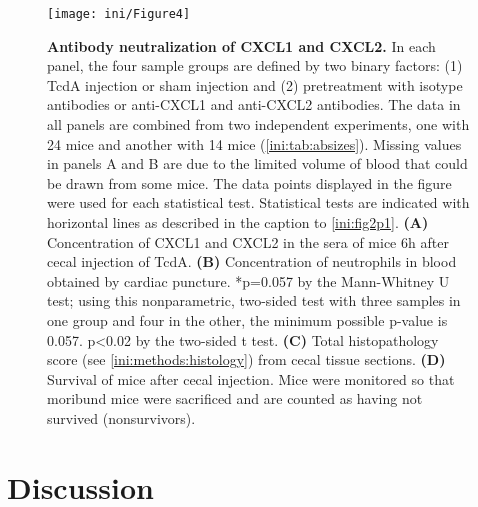 \begin{figure}[h!]
  \centering
  \texttt{[image: ini/Figure4]}
  \caption[Antibody neutralization of CXCL1 and CXCL2]{
       \textbf{Antibody neutralization of CXCL1 and CXCL2.}
        In each panel, the four sample groups are defined by two binary 
        factors: (1) TcdA injection or sham injection and (2) pretreatment 
        with isotype antibodies or anti-CXCL1 and anti-CXCL2 antibodies. 
        The data in all panels are combined from two independent 
        experiments, one with 24 mice and another with 14 mice 
        (\autoref{ini:tab:absizes}). Missing values in panels A and 
        B are due to the limited volume of blood that could be 
        drawn from some mice. The data points displayed in the figure 
        were used for each statistical test. Statistical tests are 
        indicated with horizontal lines as described in the caption 
        to \autoref{ini:fig2p1}. \textbf{(A)} Concentration of CXCL1 
        and CXCL2 in the sera of mice 6h after cecal injection of 
        TcdA. \textbf{(B)} Concentration of neutrophils in blood 
        obtained by cardiac puncture. *p=0.057 by the Mann-Whitney 
        U test; using this nonparametric, two-sided test with three 
        samples in one group and four in the other, the minimum 
        possible p-value is 0.057. p<0.02 by the two-sided t test. 
        \textbf{(C)} Total histopathology score 
        (see \ref{ini:methods:histology}) from cecal tissue 
        sections. \textbf{(D)} Survival of mice after cecal 
        injection. Mice were monitored so that moribund mice 
        were sacrificed and are counted as having not survived (nonsurvivors). 
  }
  \label{ini:fig4}
\end{figure}


\section{Discussion}

